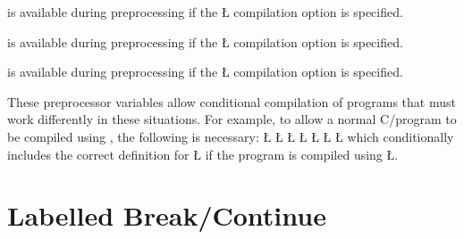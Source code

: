 \documentclass[openright,twoside]{report}
\begin{document}
\begin{prefix}
\item[\LGinlinetrue\LGbegin\lgrinde\L{\LB{\V{\_\_U\_YIELD\_\_}}}\endlgrinde\LGend{}]
is available during preprocessing if the \LGinlinetrue\LGbegin\lgrinde\L{}\endlgrinde\LGend{} compilation option is specified.

\item[\LGinlinetrue\LGbegin\lgrinde\L{\LB{\V{\_\_U\_VERIFY\_\_}}}\endlgrinde\LGend{}]
is available during preprocessing if the \LGinlinetrue\LGbegin\lgrinde\L{}\endlgrinde\LGend{} compilation option is specified.

\item[\LGinlinetrue\LGbegin\lgrinde\L{\LB{\V{\_\_U\_MULTI\_\_}}}\endlgrinde\LGend{}]
is available during preprocessing if the \LGinlinetrue\LGbegin\lgrinde\L{}\endlgrinde\LGend{} compilation option is specified.
\end{prefix}

These preprocessor variables allow conditional compilation of programs that must work differently in these situations.
For example, to allow a normal C/\CC program to be compiled using \uC, the following is necessary:
\LGinlinefalse\LGbegin\lgrinde
\L{}
\L{}
\L{}
\L{}
\L{}
\L{\LB{}}
\CE{}\L{\LB{\}}}
\endlgrinde\LGend
which conditionally includes the correct definition for \LGinlinetrue\LGbegin\lgrinde\L{}\endlgrinde\LGend{} if the program is compiled using \LGinlinetrue\LGbegin\lgrinde\L{}\endlgrinde\LGend{}. 


\section{Labelled Break/Continue}
\label{s:LabelledBreakContinue}
\end{document}
